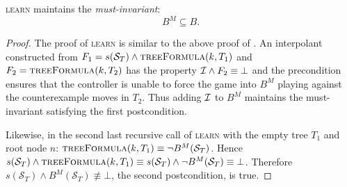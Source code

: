 \begin{proposition}
    \textsc{learn} maintains the \emph{must-invariant}: $$B^M \subseteq B.$$
\end{proposition}

\begin{proof}
The proof of \textsc{learn} is similar to the above proof of \textsc{}. An
interpolant constructed from $F_1=s(\mathcal{S}_T) \land \textsc{treeFormula}(k, T_1)$
and $F_2 = \textsc{treeFormula}(k, T_2)$ has the property $\mathcal{I} \land F_2 \equiv
\bot$ and the precondition ensures that the controller is unable to force the
game into $B^M$ playing against the counterexample moves in $T_2$. Thus adding
$\mathcal{I}$ to $B^M$ maintains the must-invariant satisfying the first postcondition.

Likewise, in the second last recursive call of \textsc{learn} with the empty
tree $T_1$ and root node $n$: $\textsc{treeFormula}(k, T_1) \equiv \lnot
B^M(\mathcal{S}_T)$.  Hence $s(\mathcal{S}_T) \land \textsc{treeFormula}(k, T_1) \equiv
s(\mathcal{S}_T) \land \lnot B^M(\mathcal{S}_T) \equiv \bot$. Therefore $s(\mathcal{S}_T) \land
B^M(\mathcal{S}_T) \not\equiv \bot$, the second postcondition, is true.
\end{proof}


